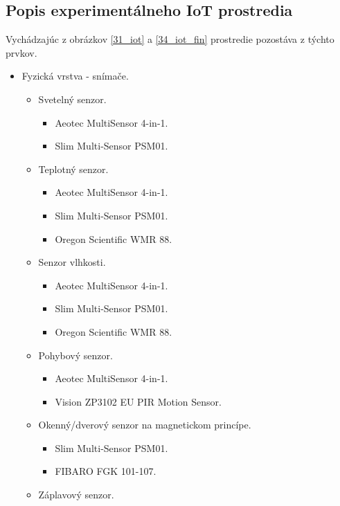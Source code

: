 \subsection{Popis experimentálneho IoT prostredia} \label{iotenv}
Vychádzajúc z obrázkov \ref{31_iot} a \ref{34_iot_fin} prostredie pozostáva z týchto prvkov.
\begin{itemize}
\item Fyzická vrstva - snímače.
  \begin{itemize}
    \item Svetelný senzor.
      \begin{itemize}
        \item Aeotec MultiSensor 4-in-1.
        \item Slim Multi-Sensor PSM01.        
       \end{itemize}
    \item Teplotný senzor.
      \begin{itemize}
        \item Aeotec MultiSensor 4-in-1.
        \item Slim Multi-Sensor PSM01.        
        \item Oregon Scientific WMR 88. 
       \end{itemize}    
    \item Senzor vlhkosti.
      \begin{itemize}
        \item Aeotec MultiSensor 4-in-1.
        \item Slim Multi-Sensor PSM01.        
        \item Oregon Scientific WMR 88. 
       \end{itemize}     
    \item Pohybový senzor.
      \begin{itemize}
        \item Aeotec MultiSensor 4-in-1.
        \item Vision ZP3102 EU PIR Motion Sensor.        
       \end{itemize}     
    \item Okenný/dverový senzor na magnetickom princípe.
      \begin{itemize}
        \item Slim Multi-Sensor PSM01.
        \item FIBARO FGK 101-107.        
       \end{itemize}            
    \item Záplavový senzor.    
      \begin{itemize}

\end{itemize}
\end{itemize}
\end{itemize}
